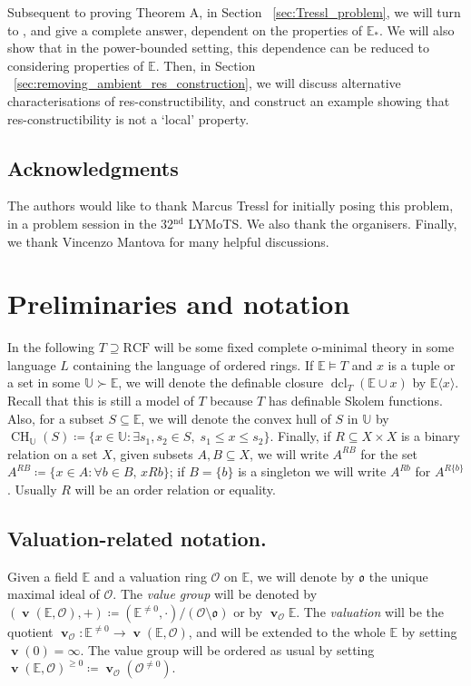 \documentclass{amsart}
\theoremstyle{remark}
\theoremstyle{definition}
\theoremstyle{plain}
\newcommand{\bE}{\mathbb E}
\newcommand{\bU}{\mathbb U}
\newcommand{\cO}{\mathcal O}
\newcommand{\co}{\mathfrak o}
\newcommand{\RCF}{\mathrm{RCF}}
\DeclareMathOperator{\val}{\mathbf{v}}
\DeclareMathOperator{\dcl}{\mathrm{dcl}}
\DeclareMathOperator{\CH}{\mathrm{CH}}
\theoremstyle{plain}
\begin{document}
Subsequent to proving Theorem A, in Section ~\ref{sec:Tressl_problem}, we will turn to \cite[Problem~5.12]{tressl2006pseudo}, and give a complete answer, dependent on the properties of $\bE_*$.
We will also show that in the power-bounded setting, this dependence can be reduced to considering properties of $\bE$. Then, in Section ~\ref{sec:removing_ambient_res_construction}, we will discuss alternative characterisations of res-constructibility, and construct an example showing that res-constructibility is not a `local' property.

\subsection*{Acknowledgments}
The authors would like to thank Marcus Tressl for initially posing this problem, in a problem session in the 32${}^{\text{nd}}$ LYMoTS. We also thank the organisers. Finally, we thank Vincenzo Mantova for many helpful discussions.


\section{Preliminaries and notation}

In the following $T\supseteq \RCF$ will be some fixed complete o-minimal theory in some language $L$ containing the language of ordered rings. If $\bE \models T$ and $x$ is a tuple or a set in some $\bU \succ \bE$, we will denote the definable closure $\dcl_T(\bE \cup x)$ by $\bE \langle x \rangle$. Recall that this is still a model of $T$ because $T$ has definable Skolem functions.
Also, for a subset $S\subseteq \bE$, we will denote the convex hull of $S$ in $\bU$ by $\CH_\bU(S) \coloneqq \{x \in \bU: \exists s_1, s_2 \in S,\; s_1\le x\le s_2\}$. Finally, if $R\subseteq X \times X$ is a binary relation on a set $X$, given subsets $A,B\subseteq X$, we will write $A^{RB}$ for the set $A^{RB}\coloneqq\{x \in A: \forall b \in B,\, xRb\}$; if $B=\{b\}$ is a singleton we will write $A^{Rb}$ for $A^{R\{b\}}$. Usually $R$ will be an order relation or equality.

\subsection{Valuation-related notation.}
Given a field $\bE$ and a valuation ring $\cO$ on $\bE$, we will denote by $\co$ the unique maximal ideal of $\cO$.
The \emph{value group} will be denoted by $(\val(\bE, \cO), +) \coloneqq (\bE^{\neq 0}, \cdot)/(\cO \setminus \co)$ or by $\val_\cO \bE$.
The \emph{valuation} will be the quotient $\val_\cO : \bE^{\neq 0} \to \val(\bE, \cO)$, and will be extended to the whole $\bE$ by setting $\val(0)=\infty$. The value group will be ordered as usual by setting $\val(\bE, \cO)^{\ge 0} \coloneqq  \val_\cO(\cO^{\neq 0})$.
\end{document}
